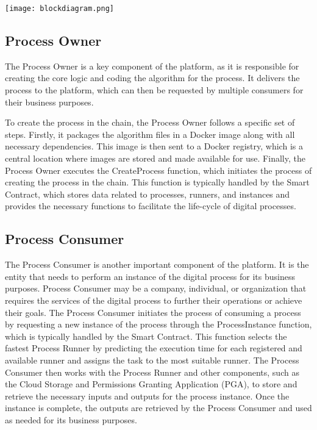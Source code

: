 \documentclass[10pt,a4paper]{report}
\begin{document}
\newpage
\begin{center}
    \texttt{[image: blockdiagram.png]}
\end{center}

\subsection{Process Owner}
\large\justify The Process Owner is a key component of the platform, as it is responsible for creating the core logic and coding the algorithm for the process. It delivers the process to the platform, which can then be requested by multiple consumers for their business purposes.

\large\justify To create the process in the chain, the Process Owner follows a specific set of steps. Firstly, it packages the algorithm files in a Docker image along with all necessary dependencies. This image is then sent to a Docker registry, which is a central location where images are stored and made available for use. Finally, the Process Owner executes the CreateProcess function, which initiates the process of creating the process in the chain. This function is typically handled by the Smart Contract, which stores data related to processes, runners, and instances and provides the necessary functions to facilitate the life-cycle of digital processes.

\subsection{Process Consumer}
\large\justify The Process Consumer is another important component of the platform. It is the entity that needs to perform an instance of the digital process for its business purposes. Process Consumer may be a company, individual, or organization that requires the services of the digital process to further their operations or achieve their goals. The Process Consumer initiates the process of consuming a process by requesting a new instance of the process through the ProcessInstance function, which is typically handled by the Smart Contract. This function selects the fastest Process Runner by predicting the execution time for each registered and available runner and assigns the task to the most suitable runner. The Process Consumer then works with the Process Runner and other components, such as the Cloud Storage and Permissions Granting Application (PGA), to store and retrieve the necessary inputs and outputs for the process instance. Once the instance is complete, the outputs are retrieved by the Process Consumer and used as needed for its business purposes.
\end{document}
